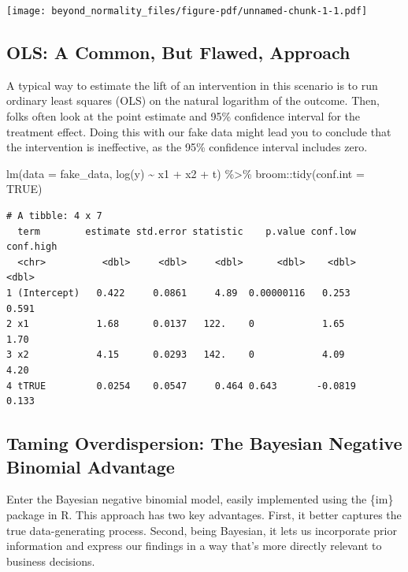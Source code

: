 \documentclass[
  letterpaper,
  DIV=11,
  numbers=noendperiod]{scrreprt}
\newenvironment{Shaded}{\begin{snugshade}}{\end{snugshade}}
\newcommand{\AttributeTok}[1]{\textcolor[rgb]{0.40,0.45,0.13}{#1}}
\newcommand{\ConstantTok}[1]{\textcolor[rgb]{0.56,0.35,0.01}{#1}}
\newcommand{\FunctionTok}[1]{\textcolor[rgb]{0.28,0.35,0.67}{#1}}
\newcommand{\NormalTok}[1]{\textcolor[rgb]{0.00,0.23,0.31}{#1}}
\newcommand{\SpecialCharTok}[1]{\textcolor[rgb]{0.37,0.37,0.37}{#1}}
\begin{document}
\texttt{[image: beyond\_normality\_files/figure-pdf/unnamed-chunk-1-1.pdf]}

\subsection{OLS: A Common, But Flawed,
Approach}\label{ols-a-common-but-flawed-approach}

A typical way to estimate the lift of an intervention in this scenario
is to run ordinary least squares (OLS) on the natural logarithm of the
outcome. Then, folks often look at the point estimate and 95\%
confidence interval for the treatment effect. Doing this with our fake
data might lead you to conclude that the intervention is ineffective, as
the 95\% confidence interval includes zero.

\begin{Shaded}
\begin{Highlighting}[]
\FunctionTok{lm}\NormalTok{(}\AttributeTok{data =}\NormalTok{ fake\_data, }\FunctionTok{log}\NormalTok{(y) }\SpecialCharTok{\textasciitilde{}}\NormalTok{ x1 }\SpecialCharTok{+}\NormalTok{ x2 }\SpecialCharTok{+}\NormalTok{ t) }\SpecialCharTok{\%\textgreater{}\%}\NormalTok{ broom}\SpecialCharTok{::}\FunctionTok{tidy}\NormalTok{(}\AttributeTok{conf.int =} \ConstantTok{TRUE}\NormalTok{)}
\end{Highlighting}
\end{Shaded}

\begin{verbatim}
# A tibble: 4 x 7
  term        estimate std.error statistic    p.value conf.low conf.high
  <chr>          <dbl>     <dbl>     <dbl>      <dbl>    <dbl>     <dbl>
1 (Intercept)   0.422     0.0861     4.89  0.00000116   0.253      0.591
2 x1            1.68      0.0137   122.    0            1.65       1.70 
3 x2            4.15      0.0293   142.    0            4.09       4.20 
4 tTRUE         0.0254    0.0547     0.464 0.643       -0.0819     0.133
\end{verbatim}

\subsection{Taming Overdispersion: The Bayesian Negative Binomial
Advantage}\label{taming-overdispersion-the-bayesian-negative-binomial-advantage}

Enter the Bayesian negative binomial model, easily implemented using the
\{im\} package in R. This approach has two key advantages. First, it
better captures the true data-generating process. Second, being
Bayesian, it lets us incorporate prior information and express our
findings in a way that's more directly relevant to business decisions.
\end{document}
